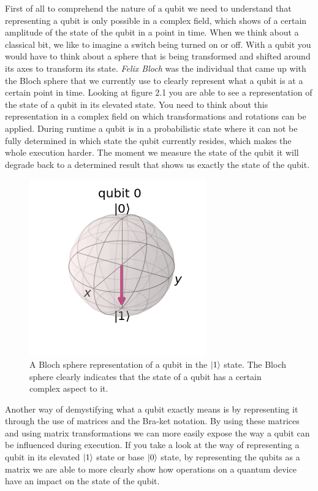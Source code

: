 First of all to comprehend the nature of a qubit we need to understand that representing a qubit is only possible in a complex field, which shows of a certain amplitude of the state of the qubit in a point in time. When we think about a classical bit, we like to imagine a switch being turned on or off. With a qubit you would have to think about a sphere that is being transformed and shifted around its axes to transform its state. \textit{Felix Bloch} was the individual that came up with the Bloch sphere that we currently use to clearly represent what a qubit is at a certain point in time. Looking at figure 2.1 you are able to see a representation of the state of a qubit in its elevated state. You need to think about this representation in a complex field on which transformations and rotations can be applied.
During runtime a qubit is in a probabilistic state where it can not be fully determined in which state the qubit currently resides, which makes the whole execution harder. The moment we measure the state of the qubit it will degrade back to a determined result that shows us exactly the state of the qubit.

\begin{figure}[h]
	\centering
	\includegraphics[scale = 0.75]{../Demonstration/img/Quantum_essentials_1.PNG}
	\caption{A Bloch sphere representation of a qubit in the $\ket{1}$ state. 
		The Bloch sphere clearly indicates that the state of a qubit has a certain complex aspect to it.}
\end{figure}

Another way of demystifying what a qubit exactly means is by representing it through the use of matrices and the Bra-ket notation. By using these matrices and using matrix transformations we can more easily expose the way a qubit can be influenced during execution. 
If you take a look at the way of representing a qubit in its elevated $\ket{1}$ state or base $\ket{0}$ state, by representing the qubits as a matrix we are able to more clearly show how operations on a quantum device have an impact on the state of the qubit.



